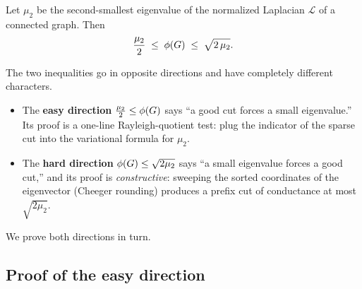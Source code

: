 \begin{theorem}
\label{ch32:cheeger-thm}
Let $\mu_2$ be the second-smallest eigenvalue of the normalized Laplacian $\mathcal{L}$ of a connected graph. Then
\[
  \frac{\mu_2}{2} \;\le\; \phi(G) \;\le\; \sqrt{2\,\mu_2}.
\]
\end{theorem}

The two inequalities go in opposite directions and have completely different characters.
\begin{itemize}
  \item The \textbf{easy direction} $\tfrac{\mu_2}{2}\le\phi(G)$ says ``a good cut forces a small eigenvalue.'' Its proof is a one-line Rayleigh-quotient test: plug the indicator of the sparse cut into the variational formula for $\mu_2$.
  \item The \textbf{hard direction} $\phi(G)\le\sqrt{2\mu_2}$ says ``a small eigenvalue forces a good cut,'' and its proof is \emph{constructive}: sweeping the sorted coordinates of the eigenvector (Cheeger rounding) produces a prefix cut of conductance at most $\sqrt{2\mu_2}$.
\end{itemize}

We prove both directions in turn.

\subsection{Proof of the easy direction}

